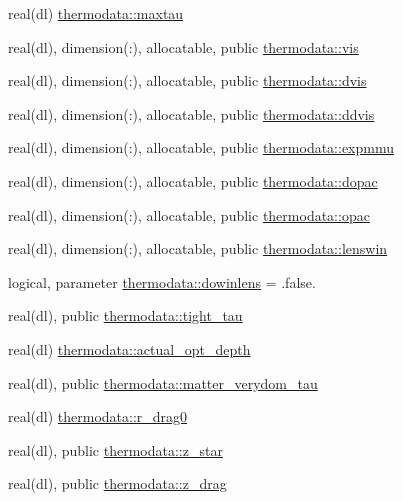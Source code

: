 \begin{DoxyCompactItemize}
\item 
real(dl) \mbox{\hyperlink{namespacethermodata_a41426412f674a69c99b7756938fc4204}{thermodata\+::maxtau}}
\item 
real(dl), dimension(\+:), allocatable, public \mbox{\hyperlink{namespacethermodata_a14ddce36570d0e50813dc92cd05b57bf}{thermodata\+::vis}}
\item 
real(dl), dimension(\+:), allocatable, public \mbox{\hyperlink{namespacethermodata_a4e5d2a5cf09e04bba23defc7dcf9e967}{thermodata\+::dvis}}
\item 
real(dl), dimension(\+:), allocatable, public \mbox{\hyperlink{namespacethermodata_aeab1ddb31ee9b39dd71d1a5a833b85f6}{thermodata\+::ddvis}}
\item 
real(dl), dimension(\+:), allocatable, public \mbox{\hyperlink{namespacethermodata_ab0ba79e6faa7c3d30e4b3a029b832d81}{thermodata\+::expmmu}}
\item 
real(dl), dimension(\+:), allocatable, public \mbox{\hyperlink{namespacethermodata_aa627075f6104ddf2acd8968688ec6f7e}{thermodata\+::dopac}}
\item 
real(dl), dimension(\+:), allocatable, public \mbox{\hyperlink{namespacethermodata_af824d4275dd6ae8475c82829c96c505c}{thermodata\+::opac}}
\item 
real(dl), dimension(\+:), allocatable, public \mbox{\hyperlink{namespacethermodata_a60473ac86869f6f9da92e4b0f76c5b12}{thermodata\+::lenswin}}
\item 
logical, parameter \mbox{\hyperlink{namespacethermodata_a4f8d2aec0f4b6bcdc91d3d574bae3ba9}{thermodata\+::dowinlens}} = .false.
\item 
real(dl), public \mbox{\hyperlink{namespacethermodata_acef8e1b2d18a8b07922432183d4673da}{thermodata\+::tight\+\_\+tau}}
\item 
real(dl) \mbox{\hyperlink{namespacethermodata_a9d1b4188f1f98683027a29df3cbdd586}{thermodata\+::actual\+\_\+opt\+\_\+depth}}
\item 
real(dl), public \mbox{\hyperlink{namespacethermodata_a13e012a8b804a7e2796df4f1afc4118e}{thermodata\+::matter\+\_\+verydom\+\_\+tau}}
\item 
real(dl) \mbox{\hyperlink{namespacethermodata_a75e62e760e36ea9df5293d2f0141edff}{thermodata\+::r\+\_\+drag0}}
\item 
real(dl), public \mbox{\hyperlink{namespacethermodata_ac0f90be6432813abe28335a041ffd10b}{thermodata\+::z\+\_\+star}}
\item 
real(dl), public \mbox{\hyperlink{namespacethermodata_a74bf8ee4af304963a6fde19400dc5931}{thermodata\+::z\+\_\+drag}}
\end{DoxyCompactItemize}


